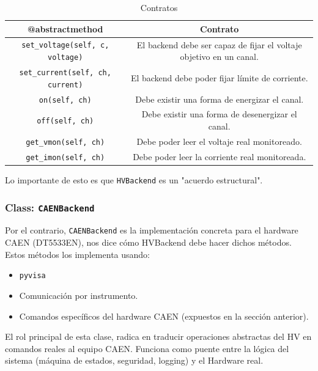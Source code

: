 \documentclass{article}
\begin{document}
\begin{table}[h]
    \centering
    \begin{tabular}{|c|c|}
        \hline
        @abstractmethod & Contrato \\ 
        \hline
        \hline
        \texttt{set\_voltage(self, c, voltage)} & El backend debe ser capaz de fijar el voltaje objetivo en un canal. \\ 
        \texttt{set\_current(self, ch, current)} & El backend debe poder fijar límite de corriente. \\ 
        \texttt{on(self, ch)} & Debe existir una forma de energizar el canal. \\

        \texttt{off(self, ch)} & Debe existir una forma de desenergizar el canal.\\

        \texttt{get\_vmon(self, ch)} & Debe poder leer el voltaje real monitoreado.\\

        \texttt{get\_imon(self, ch)} & Debe poder leer la corriente real monitoreada. 
        \hline
    \end{tabular}
    \caption{Contratos}
    \label{tab:ejemplo_dos_columnas}
\end{table}

Lo importante de esto es que \texttt{HVBackend} es un "acuerdo estructural". \\

\subsubsection{Class: \texttt{CAENBackend}}

Por el contrario, \texttt{CAENBackend} es la implementación concreta para el hardware CAEN (DT5533EN), nos dice cómo HVBackend debe hacer dichos métodos.\\ 

Estos métodos los implementa usando:
\begin{itemize}
    \item \texttt{pyvisa}
    \item Comunicación por instrumento.
    \item Comandos específicos del hardware CAEN (expuestos en la sección anterior). 
\end{itemize}

El rol principal de esta clase, radica en traducir operaciones abstractas del HV en comandos reales al equipo CAEN. Funciona como puente entre la lógica del sistema (máquina de estados, seguridad, logging) y el Hardware real. \\
\end{document}

